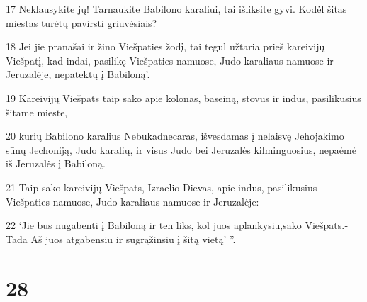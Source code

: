 \par 17 Neklausykite jų! Tarnaukite Babilono karaliui, tai išliksite gyvi. Kodėl šitas miestas turėtų pavirsti griuvėsiais? 
\par 18 Jei jie pranašai ir žino Viešpaties žodį, tai tegul užtaria prieš kareivijų Viešpatį, kad indai, pasilikę Viešpaties namuose, Judo karaliaus namuose ir Jeruzalėje, nepatektų į Babiloną’. 
\par 19 Kareivijų Viešpats taip sako apie kolonas, baseiną, stovus ir indus, pasilikusius šitame mieste, 
\par 20 kurių Babilono karalius Nebukadnecaras, išvesdamas į nelaisvę Jehojakimo sūnų Jechoniją, Judo karalių, ir visus Judo bei Jeruzalės kilminguosius, nepaėmė iš Jeruzalės į Babiloną. 
\par 21 Taip sako kareivijų Viešpats, Izraelio Dievas, apie indus, pasilikusius Viešpaties namuose, Judo karaliaus namuose ir Jeruzalėje: 
\par 22 ‘Jie bus nugabenti į Babiloną ir ten liks, kol juos aplankysiu,­sako Viešpats.­Tada Aš juos atgabensiu ir sugrąžinsiu į šitą vietą’ ”.



\chapter{28}



